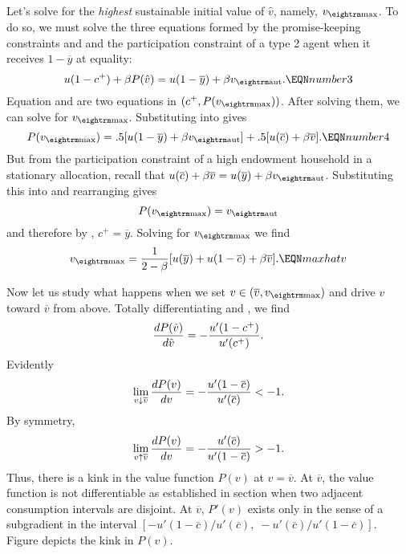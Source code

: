 Let's solve for the {\it highest\/} sustainable initial value  of
$\hat v$, namely, $v_{\rm max}$.
To do so, we must solve the three equations formed
by the  promise-keeping constraints
 and      and the participation
constraint 
of a type 2 agent when it receives $1-\overline y$ at equality:
$$ u(1-c^+) + \beta P(\hat v) = u(1-\overline y) + \beta v_{\rm aut} .
\EQN number3
$$
Equation  and  are two equations
in $(c^+, P(v_{\rm max}))$. After solving them, we can solve
 for $v_{\rm max}$.
Substituting  into  gives
$$P(v_{\rm max}) = .5[u(1-\overline y) +\beta v_{\rm aut}]
   + .5 [u(\overline c) + \beta \overline v].  \EQN number4 $$
But from the participation constraint of a high endowment
household in a stationary allocation,  recall that
$u(\overline c) + \beta \overline v = u(\overline y) + \beta v_{\rm aut}$.
Substituting this into  and rearranging gives
$$ P(v_{\rm max}) = v_{\rm aut}  $$
and therefore by , $c^+ = \overline
y$. Solving  for $v_{\rm
max}$ we find
$$v_{\rm max} = {1 \over 2-\beta}[u(\overline y)  +u(1-\overline c)
    + \beta \overline v] .  \EQN maxhatv $$


  Now let us study what happens when we set $v \in
  (\overline v, v_{\rm max})$ and drive
$v $ toward $\overline v$ from above.  Totally differentiating 
and , we find
$$ {d P(\hat v) \over d \hat v} = -{u'(1-c^+) \over u'(c^+) } . $$
Evidently
$$\lim_{v \downarrow \overline v}
{d P(v) \over d v}
= -{u'(1 -\overline c)
   \over u'(\overline c)} < -1.  $$
By symmetry,
$$\lim_{v \uparrow \overline v}
{d P(v) \over d v}
  = -{ u'(\overline c) \over u'(1-\overline c)
  } > -1 .$$
Thus, there is  a kink in the value function $P(v)$ at $v=\overline v$.
At $\overline v$, the value function is not differentiable as
established in section  when two adjacent consumption
intervals are disjoint.
At $\overline v$, $P'(v)$ exists only in the sense of
a subgradient in the interval $\left[
 -u'(1 -\overline c) / u'(\overline c),\;
  - u'(\overline c) / u'(1-\overline c)\right]$.
Figure  %
depicts the kink in $P(v)$.


